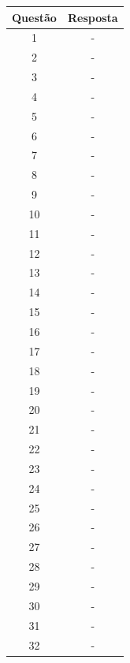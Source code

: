 \documentclass[12pt]{article}
\begin{document}
\begin{table}[H]
      \begin{tabular}{|c|c|} \hline
      \textbf{Questão} & \textbf{Resposta}\\
      \hline
      1   & - \\ \hline
      2   & - \\ \hline
      3   & - \\ \hline
      4   & - \\ \hline
      5   & - \\ \hline
      6   & - \\ \hline
      7   & - \\ \hline
      8   & - \\ \hline
      9   & - \\ \hline
      10  & - \\ \hline
      11  & - \\ \hline
      12  & - \\ \hline
      13  & - \\ \hline
      14  & - \\ \hline
      15  & - \\ \hline
      16  & - \\ \hline
      17  & - \\ \hline
      18  & - \\ \hline
      19  & - \\ \hline
      20  & - \\ \hline
      21  & - \\ \hline
      22  & - \\ \hline
      23  & - \\ \hline
      24  & - \\ \hline
      25  & - \\ \hline
      26  & - \\ \hline
      27  & - \\ \hline
      28  & - \\ \hline
      29  & - \\ \hline
      30  & - \\ \hline
      31  & - \\ \hline
      32  & - \\ \hline
      \end{tabular}
\end{table}
\end{document}
